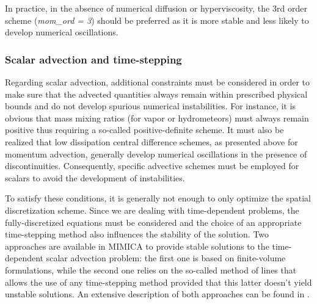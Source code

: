 \documentclass[12pt,A4,french]{article}
\begin{document}
In practice, in the absence of numerical diffusion or hyperviscosity, the 3rd order scheme ({\it mom\_ord = 3}) should be preferred as it is more stable and less likely to develop numerical oscillations.

\subsubsection{Scalar advection and time-stepping}

Regarding scalar advection, additional constraints must be considered in order to make sure that the advected quantities always remain within prescribed physical bounds and do not develop spurious numerical instabilities. For instance, it is obvious that mass mixing ratios (for vapor or hydrometeors) must always remain positive thus requiring a so-called positive-definite scheme. It must also be realized that low dissipation central difference schemes, as presented above for momentum advection, generally develop numerical oscillations in the presence of discontinuities. Consequently, specific advective schemes must be employed for scalars to avoid the development of instabilities. 

To satisfy these conditions, it is generally not enough to only optimize the spatial discretization scheme. Since we are dealing with time-dependent problems, the fully-discretized equations must be considered and the choice of an appropriate time-stepping method also influences the stability of the solution. Two approaches are available in MIMICA to provide stable solutions to the time-dependent scalar advection problem: the first one is based on finite-volume formulations, while the second one relies on the so-called method of lines that allows the use of any time-stepping method provided that this latter doesn't yield unstable solutions. An extensive description of both approaches can be found in \cite{Lev2002}.
\end{document}
